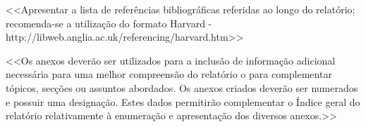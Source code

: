 \documentclass[a4paper,12pt]{scrreprt}
\begin{document}
\renewcommand\bibname{Referências}

\begin{thebibliography}{9}
<<Apresentar a lista de referências bibliográficas referidas ao longo do relatório; recomenda-se a utilização do formato Harvard - http://libweb.anglia.ac.uk/referencing/harvard.htm>>
\end{thebibliography}




\renewcommand{\nomname}{Lista de Siglas e Acrónimos}

\renewcommand{\nompreamble}{<<Apresentar uma lista com todas as siglas e acrónimos utilizados durante a realização do trabalho. O formato base para esta lista deverá ser da forma como abaixo se apresenta.>>}


\printnomenclature







    <<Os anexos deverão ser utilizados para a inclusão de informação adicional necessária para uma melhor compreensão do relatório o para complementar tópicos, secções ou assuntos abordados. Os anexos criados deverão ser numerados e possuir uma designação. Estes dados permitirão complementar o Índice geral do relatório relativamente à enumeração e apresentação dos diversos anexos.>>
    


\end{document}
